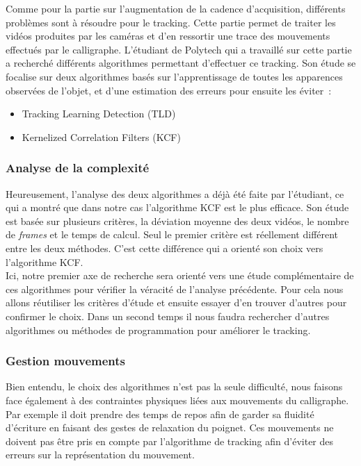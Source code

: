Comme pour la partie sur l'augmentation de la cadence d'acqui\-si\-tion, dif\-fé\-rents problèmes sont à résoudre pour le tracking. Cette partie permet de traiter les vidéos produites par les caméras et d'en ressortir une trace des mouvements effectués par le calligraphe. L'étudiant de Polytech qui a travaillé sur cette partie a recherché différents algorithmes permettant d'effectuer ce tracking. Son étude se focalise sur deux algorithmes basés sur l'apprentissage de toutes les apparences observées de l'objet, et d'une estimation des erreurs pour ensuite les éviter~:

\begin{itemize}

\item Tracking Learning Detection (TLD)

\item Kernelized Correlation Filters (KCF)

\end{itemize}

  
\subsubsection{Analyse de la complexité}

Heureusement, l'analyse des deux algorithmes a déjà été faite par l'é\-tu\-diant, ce qui a montré que dans notre cas l'al\-go\-ri\-thme KCF est le plus efficace. Son étude est basée sur plusieurs critères, la déviation moyenne des deux vidéos, le nombre de \textit{frames} et le temps de calcul. Seul le premier critère est réellement différent entre les deux méthodes. C'est cette différence qui a orienté son choix vers l'algorithme KCF. \\

Ici, notre premier axe de recherche sera orienté vers une étude complémentaire de ces algorithmes pour vérifier la véracité de l'analyse précédente. Pour cela nous allons réutiliser les critères d'étude et ensuite essayer d'en trouver d'autres pour confirmer le choix. Dans un second temps il nous faudra rechercher d'autres algorithmes ou méthodes de programmation pour améliorer le tracking.

\subsubsection{Gestion mouvements}

Bien entendu, le choix des algorithmes n'est pas la seule difficulté, nous faisons face également à des contraintes physiques liées aux mouvements du calligraphe. Par exemple il doit prendre des temps de repos afin de garder sa fluidité d'écriture en faisant des gestes de relaxation du poignet. Ces mouvements ne doivent pas être pris en compte par l'algorithme de tracking afin d'éviter des erreurs sur la représentation du mouvement. \\

